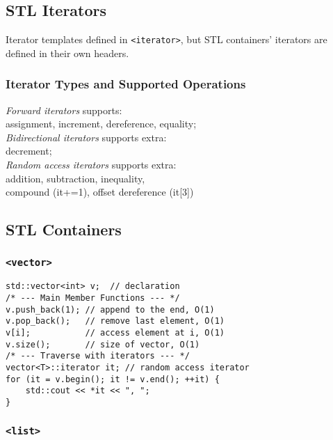\subsection*{STL Iterators}

Iterator templates defined in \texttt{<iterator>}, but STL containers'
iterators are defined in their own headers.

\subsubsection*{Iterator Types and Supported Operations}

\emph{Forward iterators} supports:\\
\hfill assignment, increment, dereference, equality;\\
\emph{Bidirectional iterators} supports extra:\\
\hfill decrement;\\
\emph{Random access iterators} supports extra:\\
\hfill addition, subtraction, inequality,\\
\hfill compound (it+=1), offset dereference (it[3])\\

\subsection*{STL Containers}

\subsubsection*{\texttt{<vector>}}

\begin{verbatim}
std::vector<int> v;  // declaration
/* --- Main Member Functions --- */
v.push_back(1); // append to the end, O(1)
v.pop_back();   // remove last element, O(1)
v[i];           // access element at i, O(1)
v.size();       // size of vector, O(1)
/* --- Traverse with iterators --- */
vector<T>::iterator it; // random access iterator
for (it = v.begin(); it != v.end(); ++it) {
    std::cout << *it << ", ";
}
\end{verbatim}
\vspace*{-1.25\baselineskip}

\subsubsection*{\texttt{<list>}}

